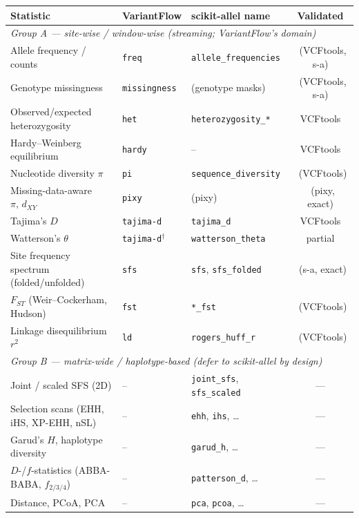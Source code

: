 \documentclass[11pt]{article}
\newcommand{\yes}{\checkmark}
\newcommand{\no}{--}
\begin{document}
\begin{table}[ht]
\centering
\small
\begin{tabularx}{\linewidth}{Xllc}
\toprule
Statistic & VariantFlow & scikit-allel name & Validated \\
\midrule
\multicolumn{4}{l}{\textit{Group A --- site-wise / window-wise (streaming; VariantFlow's domain)}}\\
\midrule
Allele frequency / counts & \texttt{freq} & \texttt{allele\_frequencies} & \yes\ (VCFtools, s-a) \\
Genotype missingness & \texttt{missingness} & (genotype masks) & \yes\ (VCFtools, s-a) \\
Observed/expected heterozygosity & \texttt{het} & \texttt{heterozygosity\_*} & VCFtools \\
Hardy--Weinberg equilibrium & \texttt{hardy} & \no & VCFtools \\
Nucleotide diversity $\pi$ & \texttt{pi} & \texttt{sequence\_diversity} & \yes\ (VCFtools) \\
Missing-data-aware $\pi,\,d_{XY}$ & \texttt{pixy} & (pixy) & \yes\ (pixy, exact) \\
Tajima's $D$ & \texttt{tajima-d} & \texttt{tajima\_d} & VCFtools \\
Watterson's $\theta$ & \texttt{tajima-d}$^{\dag}$ & \texttt{watterson\_theta} & partial \\
Site frequency spectrum (folded/unfolded) & \texttt{sfs} & \texttt{sfs}, \texttt{sfs\_folded} & \yes\ (s-a, exact) \\
$F_{ST}$ (Weir--Cockerham, Hudson) & \texttt{fst} & \texttt{*\_fst} & \yes\ (VCFtools) \\
Linkage disequilibrium $r^{2}$ & \texttt{ld} & \texttt{rogers\_huff\_r} & \yes\ (VCFtools) \\
\midrule
\multicolumn{4}{l}{\textit{Group B --- matrix-wide / haplotype-based (defer to scikit-allel by design)}}\\
\midrule
Joint / scaled SFS (2D) & \no & \texttt{joint\_sfs}, \texttt{sfs\_scaled} & --- \\
Selection scans (EHH, iHS, XP-EHH, nSL) & \no & \texttt{ehh}, \texttt{ihs}, \dots & --- \\
Garud's $H$, haplotype diversity & \no & \texttt{garud\_h}, \dots & --- \\
$D$-/$f$-statistics (ABBA-BABA, $f_{2/3/4}$) & \no & \texttt{patterson\_d}, \dots & --- \\
Distance, PCoA, PCA & \no & \texttt{pca}, \texttt{pcoa}, \dots & --- \\
\bottomrule
\end{tabularx}
\vspace{4pt}


\end{table}
\end{document}
